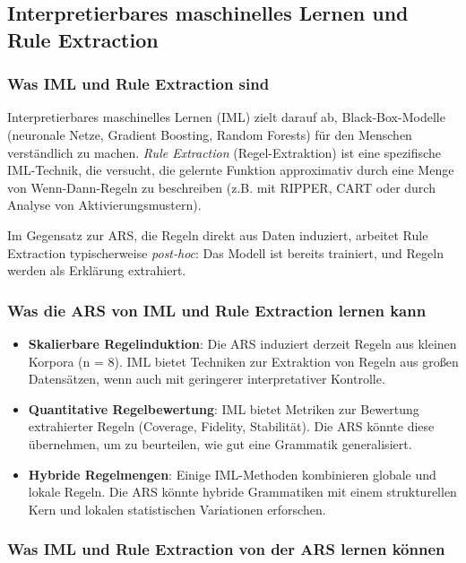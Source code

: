 \documentclass[12pt,a4paper]{article}
\begin{document}
\subsection{Interpretierbares maschinelles Lernen und Rule Extraction}

\subsubsection{Was IML und Rule Extraction sind}

Interpretierbares maschinelles Lernen (IML) zielt darauf ab, Black-Box-Modelle 
(neuronale Netze, Gradient Boosting, Random Forests) für den Menschen 
verständlich zu machen. \textit{Rule Extraction} (Regel-Extraktion) ist eine 
spezifische IML-Technik, die versucht, die gelernte Funktion approximativ 
durch eine Menge von Wenn-Dann-Regeln zu beschreiben (z.B. mit RIPPER, CART 
oder durch Analyse von Aktivierungsmustern).

Im Gegensatz zur ARS, die Regeln direkt aus Daten induziert, arbeitet Rule 
Extraction typischerweise \textit{post-hoc}: Das Modell ist bereits trainiert, 
und Regeln werden als Erklärung extrahiert.

\subsubsection{Was die ARS von IML und Rule Extraction lernen kann}

\begin{itemize}
    \item \textbf{Skalierbare Regelinduktion}: Die ARS induziert derzeit 
    Regeln aus kleinen Korpora (n = 8). IML bietet Techniken zur Extraktion 
    von Regeln aus großen Datensätzen, wenn auch mit geringerer interpretativer 
    Kontrolle.
    
    \item \textbf{Quantitative Regelbewertung}: IML bietet Metriken zur 
    Bewertung extrahierter Regeln (Coverage, Fidelity, Stabilität). Die ARS 
    könnte diese übernehmen, um zu beurteilen, wie gut eine Grammatik 
    generalisiert.
    
    \item \textbf{Hybride Regelmengen}: Einige IML-Methoden kombinieren 
    globale und lokale Regeln. Die ARS könnte hybride Grammatiken mit einem 
    strukturellen Kern und lokalen statistischen Variationen erforschen.
\end{itemize}

\subsubsection{Was IML und Rule Extraction von der ARS lernen können}
\end{document}

